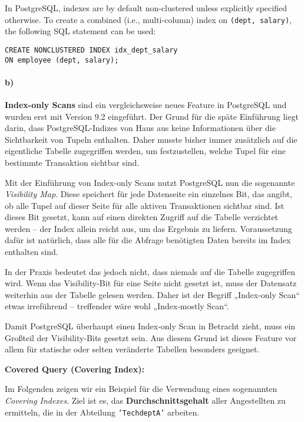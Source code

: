 \documentclass[11pt]{scrartcl}
\begin{document}
In PostgreSQL, indexes are by default non-clustered unless explicitly specified otherwise. To create a combined (i.e., multi-column) index on \texttt{(dept, salary)}, the following SQL statement can be used:

\begin{lstlisting}[style=dbtsql]
CREATE NONCLUSTERED INDEX idx_dept_salary
ON employee (dept, salary);
\end{lstlisting}


\paragraph{b)}

\textbf{Index-only Scans} sind ein vergleichsweise neues Feature in PostgreSQL und wurden erst mit Version 9.2 eingeführt. Der Grund für die späte Einführung liegt darin, dass PostgreSQL-Indizes von Haus aus keine Informationen über die Sichtbarkeit von Tupeln enthalten. Daher musste bisher immer zusätzlich auf die eigentliche Tabelle zugegriffen werden, um festzustellen, welche Tupel für eine bestimmte Transaktion sichtbar sind.

Mit der Einführung von Index-only Scans nutzt PostgreSQL nun die sogenannte \textit{Visibility Map}. Diese speichert für jede Datenseite ein einzelnes Bit, das angibt, ob alle Tupel auf dieser Seite für alle aktiven Transaktionen sichtbar sind. Ist dieses Bit gesetzt, kann auf einen direkten Zugriff auf die Tabelle verzichtet werden – der Index allein reicht aus, um das Ergebnis zu liefern. Voraussetzung dafür ist natürlich, dass alle für die Abfrage benötigten Daten bereits im Index enthalten sind.

In der Praxis bedeutet das jedoch nicht, dass niemals auf die Tabelle zugegriffen wird. Wenn das Visibility-Bit für eine Seite nicht gesetzt ist, muss der Datensatz weiterhin aus der Tabelle gelesen werden. Daher ist der Begriff „Index-only Scan“ etwas irreführend – treffender wäre wohl „Index-mostly Scan“.

Damit PostgreSQL überhaupt einen Index-only Scan in Betracht zieht, muss ein Großteil der Visibility-Bits gesetzt sein. Aus diesem Grund ist dieses Feature vor allem für statische oder selten veränderte Tabellen besonders geeignet.

\vspace{0.5em}
\noindent\textbf{Covered Query (Covering Index):}

Im Folgenden zeigen wir ein Beispiel für die Verwendung eines sogenannten \textit{Covering Indexes}. Ziel ist es, das \textbf{Durchschnittsgehalt} aller Angestellten zu ermitteln, die in der Abteilung \texttt{'TechdeptA'} arbeiten.
\end{document}
